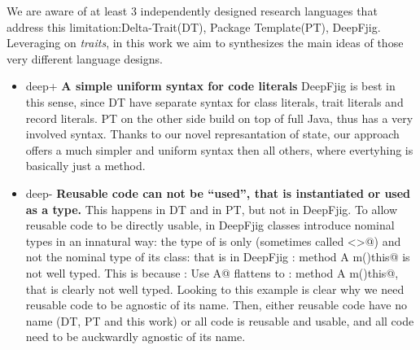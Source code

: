 We are aware of at least 3 independently designed research languages 
that address this limitation:Delta-Trait(DT)\cite{3ferruccio works}, Package Template(PT)\cite{}, DeepFjig\cite{}.
Leveraging on \emph{traits}, in this work we aim to synthesizes
the main ideas of those very different language designs.

\begin{itemize}
\item deep+ {\bf A simple uniform syntax for code literals}
DeepFjig is best in this sense, since DT have separate syntax for class literals, trait literals and record literals.
PT on the other side build on top of full Java, thus has a very involved syntax.
Thanks to our novel represantation of state, our approach offers a much simpler and uniform syntax then
all others, where evertyhing is basically just a method.
\item deep-
{\bf Reusable code can not be ``used'', that is instantiated or used as a type.}
This happens in DT and in PT, but not in DeepFjig. To allow reusable code to be directly 
usable, in DeepFjig
classes introduce nominal types in an innatural way: the type of \Q@this@ is only \Q@This@ (sometimes called \Q@<>@) and not the nominal type of its class: that is in DeepFjig 
\Q@A:{ method A m()this}@ is not well typed. This is because
\Q@B: Use A@ flattens to \Q@B:{ method A m()this}@, that is clearly not well typed.
Looking to this example is clear why we need reusable code to be agnostic of its name.
Then, either reusable code have no name (DT, PT and this work)
or all code is reusable and usable, and all code need to be auckwardly agnostic of its name.


\end{itemize}
